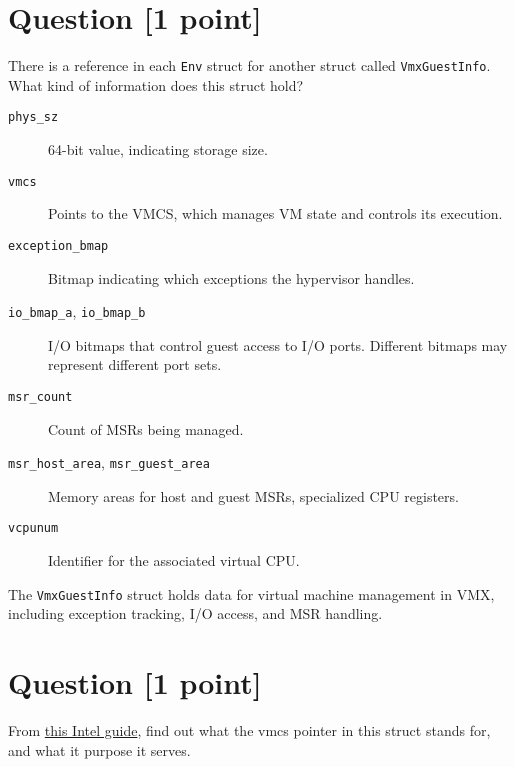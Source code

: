 \documentclass[11pt]{article}
\begin{document}
\section{Question [1 point]}

There is a reference in each \texttt{Env} struct for another struct called \texttt{VmxGuestInfo}. What kind of information does this struct hold?

\begin{solution}

    \begin{description}
        \item[\texttt{phys\_sz}] 64-bit value, indicating storage size.
        
        \item[\texttt{vmcs}] Points to the VMCS, which manages VM state and controls its execution.
        
        \item[\texttt{exception\_bmap}] Bitmap indicating which exceptions the hypervisor handles.
        
        \item[\texttt{io\_bmap\_a}, \texttt{io\_bmap\_b}] I/O bitmaps that control guest access to I/O ports. Different bitmaps may represent different port sets.
        
        \item[\texttt{msr\_count}] Count of MSRs being managed.
        
        \item[\texttt{msr\_host\_area}, \texttt{msr\_guest\_area}] Memory areas for host and guest MSRs, specialized CPU registers.
        
        \item[\texttt{vcpunum}] Identifier for the associated virtual CPU.
    \end{description}
    
    The \texttt{VmxGuestInfo} struct holds data for virtual machine management in VMX, including exception tracking, I/O access, and MSR handling.
\end{solution}


\section{Question [1 point]}

From \href{https://www.cs.utexas.edu/~vijay/cs378-f17/projects/64-ia-32-architectures-software-developer-vol-3c-part-3-manual.pdf}{this Intel guide}, find out what the vmcs pointer in this struct stands for, and what it purpose it serves.
\end{document}
